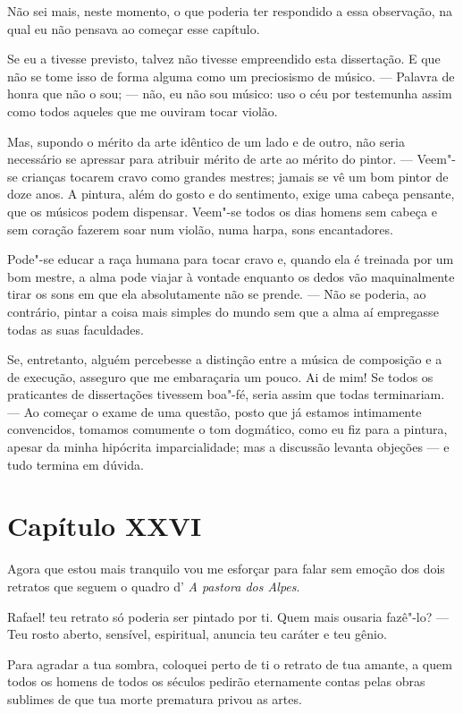  Não sei mais, neste momento, o que poderia ter respondido a essa
observação, na qual eu não pensava ao começar esse capítulo.

 Se eu a tivesse previsto, talvez não tivesse empreendido esta
dissertação. E que não se tome isso de forma alguma como um preciosismo
de músico. --- Palavra de honra que não o sou; --- não, eu não sou
músico: uso o céu por testemunha assim como todos aqueles que me
ouviram tocar violão.

 Mas, supondo o mérito da arte idêntico de um lado e de outro, não seria
necessário se apressar para atribuir mérito de arte ao mérito do
pintor. --- Veem"-se crianças tocarem cravo como grandes mestres; jamais
se vê um bom pintor de doze anos. A pintura, além do gosto e do
sentimento, exige uma cabeça pensante, que os músicos podem dispensar.
Veem"-se todos os dias homens sem cabeça e sem coração fazerem soar num
violão, numa harpa, sons encantadores. 

 Pode"-se educar a raça humana para tocar cravo e, quando ela é treinada
por um bom mestre, a alma pode viajar à vontade enquanto os dedos vão
maquinalmente tirar os sons em que ela absolutamente não se prende. ---
Não se poderia, ao contrário, pintar a coisa mais simples do mundo sem
que a alma aí empregasse todas as suas faculdades.

 Se, entretanto, alguém percebesse a distinção entre a música de
composição e a de execução, asseguro que me embaraçaria um pouco. Ai de
mim! Se todos os praticantes de dissertações tivessem boa"-fé, seria
assim que todas terminariam. --- Ao começar o exame de uma questão,
posto que já estamos intimamente convencidos, tomamos comumente o tom
dogmático, como eu fiz para a pintura, apesar da minha hipócrita
imparcialidade; mas a discussão levanta objeções --- e tudo termina em
dúvida.

\section*{Capítulo XXVI}

 Agora que estou mais tranquilo vou me esforçar para falar sem emoção
dos dois retratos que seguem o quadro d’ \textit{A pastora dos Alpes}. 

 Rafael! teu retrato só poderia ser pintado por ti. Quem mais ousaria
fazê"-lo? --- Teu rosto aberto, sensível, espiritual, anuncia teu
caráter e teu gênio.

 Para agradar a tua sombra, coloquei perto de ti o retrato de tua
amante, a quem todos os homens de todos os séculos pedirão eternamente
contas pelas obras sublimes de que tua morte prematura privou as artes.


